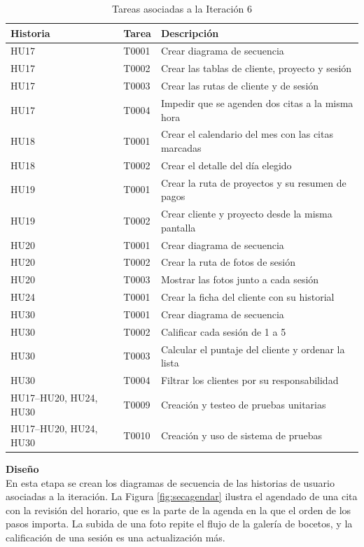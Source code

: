 \documentclass[12pt,letterpaper,oneside]{report}
\newcommand{\tituloparpegado}[1]{\par\textbf{#1}\\\indent\ignorespaces}
\begin{document}
\begin{table}[H]
  \centering
  \caption{Tareas asociadas a la Iteración 6}
  \label{tab:tareas6}
  \renewcommand{\arraystretch}{1.2}
  \begin{tabular}{|l|l|p{7.2cm}|}
    \hline
    \textbf{Historia} & \textbf{Tarea} & \textbf{Descripción} \\
    \hline
    HU17 & T0001 & Crear diagrama de secuencia \\ \hline
    HU17 & T0002 & Crear las tablas de cliente, proyecto y sesión \\ \hline
    HU17 & T0003 & Crear las rutas de cliente y de sesión \\ \hline
    HU17 & T0004 & Impedir que se agenden dos citas a la misma hora \\ \hline
    HU18 & T0001 & Crear el calendario del mes con las citas marcadas \\ \hline
    HU18 & T0002 & Crear el detalle del día elegido \\ \hline
    HU19 & T0001 & Crear la ruta de proyectos y su resumen de pagos \\ \hline
    HU19 & T0002 & Crear cliente y proyecto desde la misma pantalla \\ \hline
    HU20 & T0001 & Crear diagrama de secuencia \\ \hline
    HU20 & T0002 & Crear la ruta de fotos de sesión \\ \hline
    HU20 & T0003 & Mostrar las fotos junto a cada sesión \\ \hline
    HU24 & T0001 & Crear la ficha del cliente con su historial \\ \hline
    HU30 & T0001 & Crear diagrama de secuencia \\ \hline
    HU30 & T0002 & Calificar cada sesión de 1 a 5 \\ \hline
    HU30 & T0003 & Calcular el puntaje del cliente y ordenar la lista \\ \hline
    HU30 & T0004 & Filtrar los clientes por su responsabilidad \\ \hline
    HU17--HU20, HU24, HU30 & T0009 & Creación y testeo de pruebas unitarias \\ \hline
    HU17--HU20, HU24, HU30 & T0010 & Creación y uso de sistema de pruebas \\ \hline
  \end{tabular}
\end{table}

\vspace{0.3cm}
\tituloparpegado{Diseño}
En esta etapa se crean los diagramas de secuencia de las historias de usuario asociadas a la iteración. La Figura \ref{fig:secagendar} ilustra el agendado de una cita con la revisión del horario, que es la parte de la agenda en la que el orden de los pasos importa. La subida de una foto repite el flujo de la galería de bocetos, y la calificación de una sesión es una actualización más.
\end{document}
